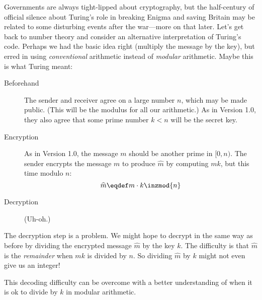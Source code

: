 Governments are always tight-lipped about cryptography, but the
half-century of official silence about Turing's role in breaking
Enigma and saving Britain may be related to some disturbing events
after the war---more on that later.  Let's get back to number theory
and consider an alternative interpretation of Turing's code.  Perhaps
we had the basic idea right (multiply the message by the key), but
erred in using \emph{conventional} arithmetic instead of
\emph{modular} arithmetic.  Maybe this is what Turing meant:
\begin{description}

\item[Beforehand] The sender and receiver agree on a large number $n$,
  which may be made public.  (This will be the modulus for all our
  arithmetic.)  As in Version 1.0, they also agree that some prime
  number $k < n$ will be the secret key.

\item[Encryption] As in Version 1.0, the message $m$ should be another
  prime in $[0, n)$.  The sender encrypts the message $m$ to produce
    $\widehat{m}$ by computing $mk$, but this time modulo $n$:
\begin{equation}
\widehat{m} \eqdef m \cdot k \inzmod{n}\label{eq:turing-code} 
\end{equation}

\item[Decryption] (Uh-oh.)

\end{description}

The decryption step is a problem.  We might hope to decrypt in the
same way as before by dividing the encrypted message $\widehat{m}$ by the key
$k$.  The difficulty is that $\widehat{m}$ is the \emph{remainder} when $mk$
is divided by $n$.  So dividing $\widehat{m}$ by $k$ might not even give us an
integer!

This decoding difficulty can be overcome with a better understanding
of when it is ok to divide by $k$ in modular arithmetic.

\begin{problems}
\examproblems
{}
\end{problems}

\section{}\label{sec:inverse}


